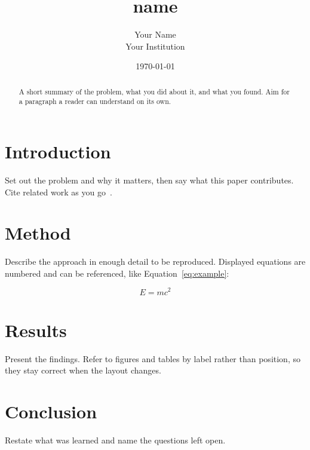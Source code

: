 \documentclass[11pt,a4paper]{article}
\title{{name}}
\author{Your Name\\ \small Your Institution}
\date{\today}
\begin{document}
\maketitle

\begin{abstract}
    A short summary of the problem, what you did about it, and what you
    found. Aim for a paragraph a reader can understand on its own.
\end{abstract}

\section{Introduction}
\label{sec:introduction}

Set out the problem and why it matters, then say what this paper
contributes. Cite related work as you go~\cite{knuth1984texbook}.

\section{Method}
\label{sec:method}

Describe the approach in enough detail to be reproduced. Displayed
equations are numbered and can be referenced, like
Equation~\ref{eq:example}:

\begin{equation}
    \label{eq:example}
    E = mc^2
\end{equation}

\section{Results}
\label{sec:results}

Present the findings. Refer to figures and tables by label rather than
position, so they stay correct when the layout changes.

\section{Conclusion}
\label{sec:conclusion}

Restate what was learned and name the questions left open.



\end{document}
